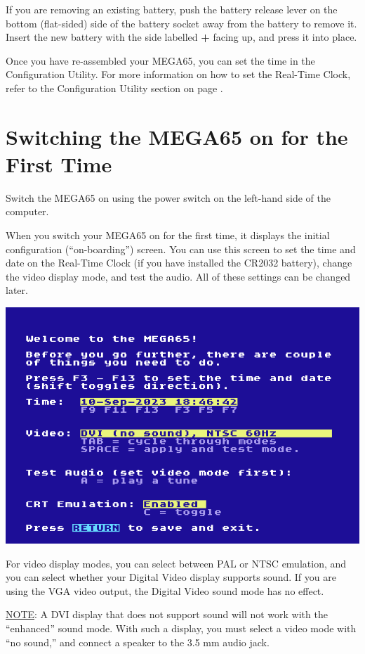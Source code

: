 If you are removing an existing battery, push the battery release lever on the bottom (flat-sided) side of the battery socket away from the battery to remove it. Insert the new battery with the side labelled {\bf +} facing up, and press it into place.

Once you have re-assembled your MEGA65, you can set the time in the Configuration Utility. For more information on how to set the Real-Time Clock, refer to the Configuration Utility section on page \pageref{sec:configuration-utility}.


\newpage

\section{Switching the MEGA65 on for the First Time}
\label{onboarding}

Switch the MEGA65 on using the power switch on the left-hand side of the computer.

When you switch your MEGA65 on for the first time, it displays the initial configuration (``on-boarding'') screen. You can use this screen to set the time and date on the Real-Time Clock (if you have installed the CR2032 battery), change the video display mode, and test the audio. All of these settings can be changed later.

\begin{center}
  \includegraphics[width=0.7\linewidth]{images/img011_final_boot_01.png}
\end{center}

For video display modes, you can select between PAL or NTSC emulation, and you can select whether your Digital Video display supports sound. If you are using the VGA video output, the Digital Video sound mode has no effect.

\underline{NOTE}: A DVI display that does not support sound will not work with the ``enhanced'' sound mode. With such a display, you must select a video mode with ``no sound,'' and connect a speaker to the 3.5 mm audio jack.

